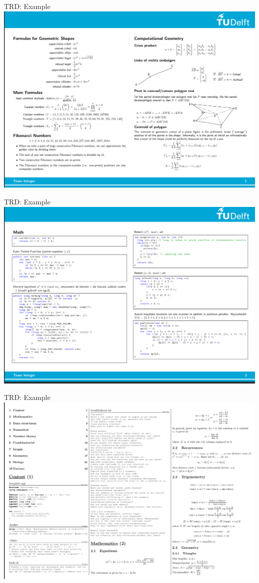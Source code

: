 \documentclass[11pt,pdf, aspectratio=169]{beamer}
\begin{document}
  \begin{frame}{TRD: Example}
    \includegraphics[width=.8\linewidth]{images/session-3/tcr-1}
  \end{frame}
  \begin{frame}{TRD: Example}
    \includegraphics[width=.8\linewidth]{images/session-3/tcr-2}
  \end{frame}
  \begin{frame}{TRD: Example}
    \includegraphics[width=.8\linewidth]{images/session-3/tcr-3}
  \end{frame}
\end{document}
